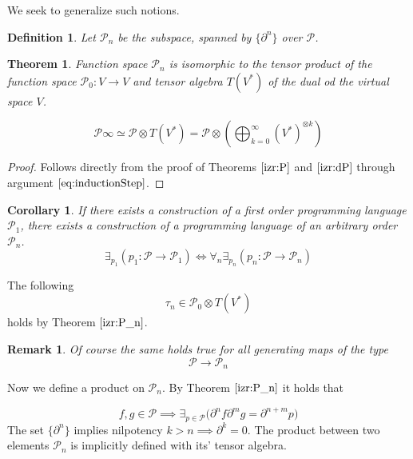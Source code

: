 \documentclass{article}
\newcommand{\dP}{\mathcal{P}}
\newcommand{\D}{\partial}
\newcommand{\sumd}{\tau}
\newtheorem{definicija}{Definition}[section]
\newtheorem{izrek}{Theorem}[section]
\newtheorem{opomba}{Remark}[section]
\newtheorem{corollary}{Corollary}[section]
\begin{document}
We seek to generalize such notions.

\begin{definicija}\label{def:P_n}
Let $\dP_n$ be the subspace, spanned by $\{\partial^n\}$ over $\dP$.
 \end{definicija}
 
 \begin{izrek}\label{izr:P_n}
 	Function space $\dP_n$ is isomorphic to the tensor product of the function space $\dP_0:V\to V$ and tensor algebra $T(V^*)$ of the dual od the virtual space $V$.
 	
 	\begin{equation}
 	\label{eq:P_algebra}
 	 	    \dP\infty\simeq \dP\otimes T(V^*) = \dP \otimes\left(\bigoplus_{k=0}^\infty (V^*)^{\otimes k} \right)
 	\end{equation}
 \end{izrek}
 
 \begin{proof} Follows directly from the proof of Theorems $\ref{izr:P}$ and $\ref{izr:dP}$ through argument $\eqref{eq:inductionStep}$.
  \end{proof}
  \begin{corollary}
  If there exists a construction of a first order programming language $\dP_1$, there exists a construction of a programming language of an arbitrary order $\dP_n$.
  \begin{equation}
  \exists_{p_1}(p_1:\dP\to\dP_1)\iff\forall_n\exists_{p_n}(p_n:\dP\to\dP_n)
  \end{equation}
  \end{corollary}
     
    The following
     \begin{equation}
     	\sumd_n\in\dP_0\otimes T(V^*)
     \end{equation}
   	holds by Theorem $\ref{izr:P_n}$.
        \begin{opomba}
        Of course the same holds true for all generating maps of the type
        $$\dP\to\dP_n$$
        \end{opomba}

Now we define a product on $\dP_n$. By Theorem $\ref{izr:P_n}$ it holds that

\begin{equation}
	f,g\in\dP\implies\exists_{p\in\dP}\Big(\D^nf\D^mg=\D^{n+m}p\Big)
\end{equation}
The set $\{\D^n\}$ implies nilpotency $k>n\implies\D^k=0$. The product between two elements $\dP_n$ is implicitly defined with its' tensor algebra. 
\end{document}
